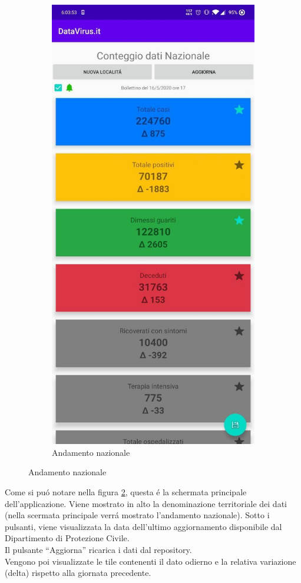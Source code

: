 \documentclass{article}
\newcommand{\quotes}[1]{``#1''}
\begin{document}
\begin{figure}[h]
\begin{subfigure}{.5\textwidth}
          \includegraphics[width=.7\linewidth]{main_activity.jpg}
          \caption{Andamento nazionale}
          \label{fig1:sub2}
        \end{subfigure}
    \end{figure}
    
    Come si puó notare nella figura \ref{fig1:sub2}, questa é la schermata principale dell'applicazione. 
    Viene mostrato in alto la denominazione territoriale dei dati (nella scermata principale verrá mostrato l'andamento nazionale). Sotto i pulsanti, viene visualizzata la data dell'ultimo aggiornamento disponibile dal Dipartimento di Protezione Civile.
    \\
    Il pulsante \quotes{Aggiorna} ricarica i dati dal repository.
    \\
    Vengono poi visualizzate le tile contenenti il dato odierno e la relativa variazione (delta) rispetto alla giornata precedente.
    \\
\end{document}
